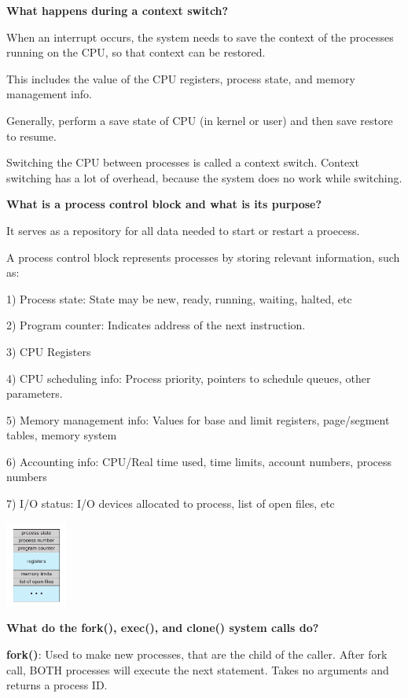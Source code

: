 \documentclass[8pt,landscape]{article}
\begin{document}
\begin{multicols}{3}
\begin{tiny}
\textbf{What happens during a context switch?}

When an interrupt occurs, the system needs to save the context of the processes running on the CPU,
so that context can be restored.

This includes the value of the CPU registers, process state, and memory management info.

Generally, perform a save state of CPU (in kernel or user) and then save restore to resume.

Switching the CPU between processes is called a context switch. Context switching has a lot of 
overhead, because the system does no work while switching.

\textbf{What is a process control block and what is its purpose?}

It serves as a repository for all data needed to start or restart a proecess.

A process control block represents processes by storing relevant information, such as:

1) Process state: State may be new, ready, running, waiting, halted, etc

2) Program counter: Indicates address of the next instruction.

3) CPU Registers

4) CPU scheduling info: Process priority, pointers to schedule queues, other parameters.

5) Memory management info: Values for base and limit registers, page/segment tables, memory system

6) Accounting info: CPU/Real time used, time limits, account numbers, process numbers

7) I/O status: I/O devices allocated to process, list of open files, etc

\begingroup
	\centering
	\includegraphics[width=2cm]{PCB.png}
	\label{fig:b}
\endgroup

\textbf{What do the fork(), exec(), and clone() system calls do?}

\textbf{fork()}: Used to make new processes, that are the child of the caller. 
After fork call, BOTH processes will execute the next statement. Takes no arguments and 
returns a process ID.


\end{tiny}
\end{multicols}
\end{document}
